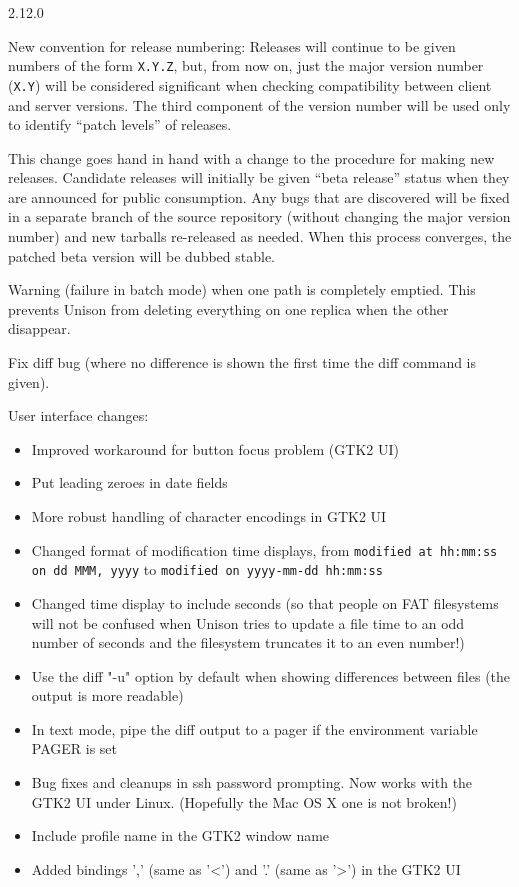 \begin{changesfromversion}{2.12.0}
\item New convention for release numbering: Releases will continue to be
given numbers of the form \verb|X.Y.Z|, but, 
from now on, just the major version number (\verb|X.Y|) will be considered
significant when checking compatibility between client and server versions.
The third component of the version number will be used only to identify
``patch levels'' of releases.

This change goes hand in hand with a change to the procedure for making new
releases.  Candidate releases will initially be given ``beta release''
status when they are announced for public consumption.  Any bugs that are
discovered will be fixed in a separate branch of the source repository
(without changing the major version number) and new tarballs re-released as
needed.  When this process converges, the patched beta version will be
dubbed stable.

\item Warning (failure in batch mode) when one path is completely emptied.
  This prevents Unison from deleting everything on one replica when
  the other disappear.

\item Fix diff bug (where no difference is shown the first time the diff
  command is given).

\item User interface changes:
\begin{itemize}
\item Improved workaround for button focus problem (GTK2 UI)
\item Put leading zeroes in date fields
\item More robust handling of character encodings in GTK2 UI
\item Changed format of modification time displays, from \verb|modified at hh:mm:ss on dd MMM, yyyy|
to \verb|modified on yyyy-mm-dd hh:mm:ss|
\item Changed time display to include seconds (so that people on FAT
  filesystems will not be confused when Unison tries to update a file
  time to an odd number of seconds and the filesystem truncates it to
  an even number!)
\item Use the diff "-u" option by default when showing differences between files
  (the output is more readable)
\item In text mode, pipe the diff output to a pager if the environment
  variable PAGER is set
\item Bug fixes and cleanups in ssh password prompting.  Now works with
  the GTK2 UI under Linux.  (Hopefully the Mac OS X one is not broken!)
\item Include profile name in the GTK2 window name
\item Added bindings ',' (same as '<') and '.' (same as '>') in the GTK2 UI
\end{itemize}


\end{changesfromversion}
